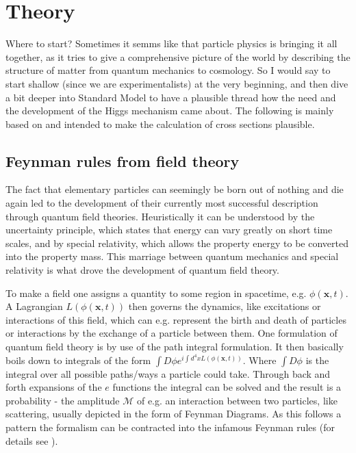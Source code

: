 \chapter{Theory}

Where to start? Sometimes it semms like that particle physics is bringing it all together, as it tries to give a comprehensive picture of the world by describing the structure of matter from quantum mechanics to cosmology. So I would say to start shallow (since we are experimentalists) at the very beginning, and then dive a bit deeper into Standard Model to have a plausible thread how the need and the development of the Higgs mechanism came about. The following is mainly based on \citep{zee2010quantum,griffiths2020introduction} and intended to make the calculation of cross sections plausible.

\section{Feynman rules from field theory}\label{sec:field_theory}
The fact that elementary particles can seemingly be born out of nothing and die again led to the development of their currently most successful description through quantum field theories. Heuristically it can be understood by the uncertainty principle, which states that energy can vary greatly on short time scales, and by special relativity, which allows the property energy to be converted into the property mass. This marriage between quantum mechanics and special relativity is what drove the development of quantum field theory. 


To make a field one assigns a quantity to some region in spacetime, e.g. $\phi(\bm{x},t)$. A Lagrangian $L(\phi(\bm{x},t))$ then governs the dynamics, like excitations or interactions of this field, which can e.g. represent the birth and death of particles or interactions by the exchange of a particle between them. One formulation of quantum field theory is by use of the path integral formulation. It then basically boils down to integrals of the form $\int D\phi e^{i\int d^4x L(\phi(\bm{x},t))}$. Where $\int D\phi$ is the integral over all possible paths/ways a particle could take. Through back and forth expansions of the $e$ functions the integral can be solved and the result is a probability - the amplitude $\mathcal{M}$ of e.g. an interaction between two particles, like scattering, usually depicted in the form of Feynman Diagrams. As this follows a pattern the formalism can be contracted into the infamous Feynman rules (for details see \citep{griffiths2020introduction}). 

